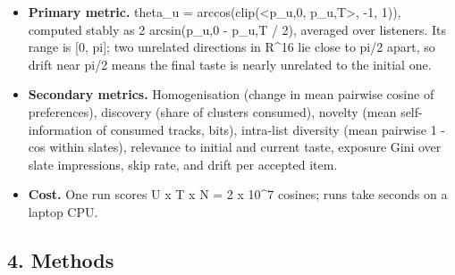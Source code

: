 \documentclass[
]{article}
\begin{document}
\begin{itemize}
  by global consumption count plus base popularity. SIM: top-k by
  cos(p\_hat, x\_i), where p\_hat is the normalised mean of consumed
  embeddings after a 5-step random warm-up (the recommender never sees
  p\_u,t, except in the oracle ablation of EXP-003). MMR: maximal
  marginal relevance re-ranking of SIM, lambda = 0.5. EXPLORE:
  epsilon-greedy SIM, epsilon = 0.2.
\item
  \textbf{Primary metric.} theta\_u = arccos(clip(\textless p\_u,0,
  p\_u,T\textgreater, -1, 1)), computed stably as 2
  arcsin(\textbar\textbar p\_u,0 - p\_u,T\textbar\textbar{} / 2),
  averaged over listeners. Its range is {[}0, pi{]}; two unrelated
  directions in R\^{}16 lie close to pi/2 apart, so drift near pi/2
  means the final taste is nearly unrelated to the initial one.
\item
  \textbf{Secondary metrics.} Homogenisation (change in mean pairwise
  cosine of preferences), discovery (share of clusters consumed),
  novelty (mean self-information of consumed tracks, bits), intra-list
  diversity (mean pairwise 1 - cos within slates), relevance to initial
  and current taste, exposure Gini over slate impressions, skip rate,
  and drift per accepted item.
\item
  \textbf{Cost.} One run scores U x T x N = 2 x 10\^{}7 cosines; runs
  take seconds on a laptop CPU.
\end{itemize}

\subsection{4. Methods}\label{methods}
\end{document}
